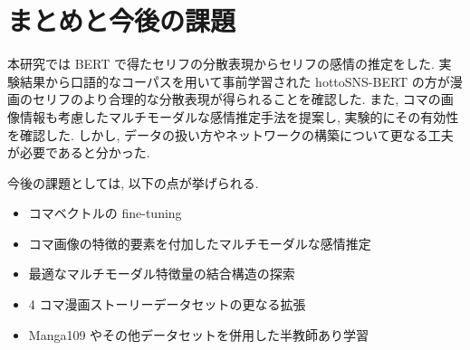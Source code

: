 \newpage
\changeindent{0cm}
\section{まとめと今後の課題}
\changeindent{2cm}

本研究では BERT で得たセリフの分散表現からセリフの感情の推定をした. 実験結果から口語的なコーパスを用いて事前学習された hottoSNS-BERT の方が漫画のセリフのより合理的な分散表現が得られることを確認した. また, コマの画像情報も考慮したマルチモーダルな感情推定手法を提案し, 実験的にその有効性を確認した. しかし, データの扱い方やネットワークの構築について更なる工夫が必要であると分かった.

今後の課題としては, 以下の点が挙げられる.

\begin{itemize}
  \item コマベクトルの fine-tuning
  \item コマ画像の特徴的要素を付加したマルチモーダルな感情推定
  \item 最適なマルチモーダル特徴量の結合構造の探索
  \item 4 コマ漫画ストーリーデータセットの更なる拡張
  \item Manga109 やその他データセットを併用した半教師あり学習
\end{itemize}
